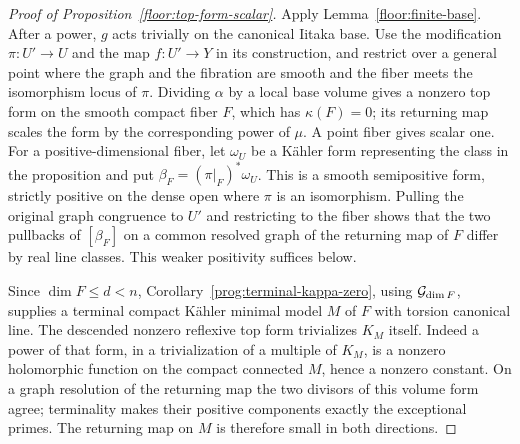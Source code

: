 \begin{proof}[Proof of Proposition~\ref{floor:top-form-scalar}]
Apply Lemma~\ref{floor:finite-base}.  After a power, \(g\) acts trivially
on the canonical Iitaka base.  Use the modification \(\pi:U'\to U\) and
the map \(f:U'\to Y\) in its construction, and restrict over a general
point where the graph and the fibration are smooth and the fiber meets the
isomorphism locus of \(\pi\).  Dividing \(\alpha\) by a local base volume
gives a nonzero top form on the smooth compact fiber \(F\), which has
\(\kappa(F)=0\); its returning map scales the form by the corresponding
power of \(\mu\).  A point fiber gives scalar one.  For a positive-dimensional
fiber, let \(\omega_U\) be a K\"ahler form representing the class in the
proposition and put \(\beta_F=(\pi|_F)^*\omega_U\).  This is a smooth
semipositive form, strictly positive on the dense open where \(\pi\) is
an isomorphism.  Pulling the original graph congruence to \(U'\) and
restricting to the fiber shows that the two pullbacks of \([\beta_F]\) on
a common resolved graph of the returning map of \(F\) differ by real line classes.
This weaker positivity suffices below.

Since \(\dim F\leq d<n\), Corollary~\ref{prog:terminal-kappa-zero}, using
\(\mathcal G_{\dim F}\), supplies a terminal compact K\"ahler minimal model
\(M\) of \(F\) with torsion canonical line.  The descended
nonzero reflexive top form trivializes \(K_M\) itself.  Indeed a power of
that form, in a trivialization of a multiple of \(K_M\), is a nonzero
holomorphic function on the compact connected \(M\), hence a nonzero
constant.  On a graph resolution of the returning map the two divisors of
this volume form agree; terminality makes their positive components exactly
the exceptional primes.  The returning map on \(M\) is therefore small
in both directions.


\end{proof}
